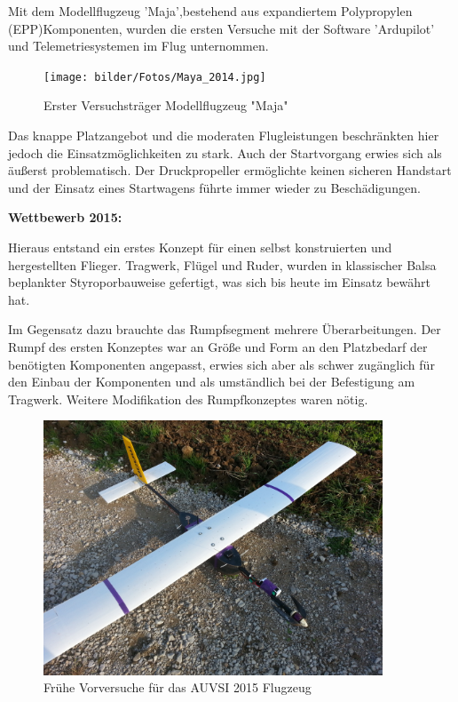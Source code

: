 Mit dem Modellflugzeug 'Maja',bestehend aus expandiertem Polypropylen (EPP)Komponenten, wurden die ersten Versuche mit der Software 'Ardupilot' und Telemetriesystemen im Flug unternommen.

\begin{figure}[H]
\centering
\texttt{[image: bilder/Fotos/Maya\_2014.jpg]} 
\caption{Erster Versuchsträger Modellflugzeug "Maja"} 
\label{Erster Versuchsträger Modellflugzeug "Maja"}
\end{figure}

Das knappe Platzangebot und die moderaten Flugleistungen beschränkten hier jedoch die Einsatzmöglichkeiten zu stark. Auch der Startvorgang erwies sich als äußerst problematisch. Der Druckpropeller ermöglichte keinen sicheren Handstart und der Einsatz eines Startwagens führte immer wieder zu Beschädigungen.

\clearpage

\textbf{Wettbewerb 2015:}

Hieraus entstand ein erstes Konzept für einen selbst konstruierten und hergestellten Flieger. Tragwerk, Flügel und Ruder, wurden in klassischer Balsa beplankter Styroporbauweise gefertigt, was sich bis heute im Einsatz bewährt hat. 

Im Gegensatz dazu brauchte das Rumpfsegment mehrere Überarbeitungen. Der Rumpf des ersten Konzeptes war an Größe und Form an den Platzbedarf der benötigten Komponenten angepasst, erwies sich aber als schwer zugänglich für den Einbau der Komponenten und als umständlich bei der Befestigung am Tragwerk. Weitere Modifikation des Rumpfkonzeptes waren nötig.

\begin{figure}[H]
\centering
\includegraphics[width=0.9\textwidth]{bilder/Fotos/AUVSI-MAYA-Hybrid.jpg} 
\caption{Frühe Vorversuche für das AUVSI 2015 Flugzeug} 
\label{Frühe Vorversuche für das AUVSI 2015 Flugzeug}
\end{figure}

